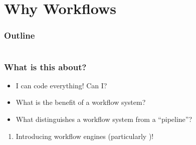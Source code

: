 \section{Why Workflows}

\begin{frame}
    \frametitle{Outline}
    \begin{columns}[t]
        \begin{column}{.5\textwidth}
            \tableofcontents[sections={1-7},currentsection]
        \end{column}
        \begin{column}{.5\textwidth}
            \tableofcontents[sections={8-15},currentsection]
        \end{column}
    \end{columns}
\end{frame}

\begin{frame}
  \frametitle{What is this about?}
   \begin{question}[Questions]
   	 \begin{itemize}
        \item I can code everything! Can I?
        \item What is the benefit of a workflow system?
        \item What distinguishes a workflow system from a ``pipeline''?
     \end{itemize}
   \end{question}
   \begin{docs}[Objectives]
   	  \begin{enumerate}
         \item Introducing workflow engines (particularly \Snakemake)!
      \end{enumerate}
   \end{docs}
\end{frame}  

